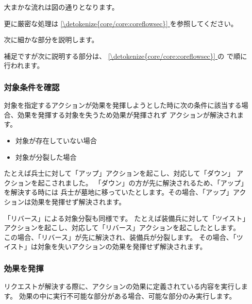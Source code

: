 \documentclass[letterpaper,10pt,dvipdfmx]{sphinxmanual}
\begin{document}
\sphinxAtStartPar
大まかな流れは図の通りとなります。

\sphinxAtStartPar
更に厳密な処理は \hyperref[\detokenize{core/core:coreflowsec}]{\ref{\detokenize{core/core:coreflowsec}} } を参照してください。

\sphinxAtStartPar
次に細かな部分を説明します。

\sphinxAtStartPar
補足ですが次に説明する部分は、 \hyperref[\detokenize{core/core:coreflowsec}]{\ref{\detokenize{core/core:coreflowsec}} } の {\hyperref[\detokenize{core/core:actresolve}]{}} で順に行われます。


\subsubsection{対象条件を確認}
\label{\detokenize{common/common:id29}}
\sphinxAtStartPar
対象を指定するアクションが効果を発揮しようとした時に次の条件に該当する場合、効果を発揮する対象を失うため効果が発揮されず
アクションが解決されます。
\begin{itemize}
\item {} 
\sphinxAtStartPar
対象が存在していない場合

\item {} 
\sphinxAtStartPar
対象が分裂した場合

\end{itemize}

\sphinxAtStartPar
たとえば兵士に対して「アップ」アクションを起こし、対応して「ダウン」
アクションを起こされました。
「ダウン」の方が先に解決されるため、「アップ」を解決する時には
兵士が墓地に移っていたとします。その場合、「アップ」アクションは効果を発揮せず解決されます。

\sphinxAtStartPar
「リバース」による対象分裂も同様です。
たとえば装備兵に対して「ツイスト」アクションを起こし、対応して「リバース」アクションを起こしたとします。
この場合、「リバース」が先に解決され、装備兵が分裂します。
その場合、「ツイスト」は対象を失いアクションの効果を発揮せず解決されます。


\subsubsection{効果を発揮}
\label{\detokenize{common/common:id30}}
\sphinxAtStartPar
リクエストが解決する際に、アクションの効果に定義されている内容を実行します。
効果の中に実行不可能な部分がある場合、可能な部分のみ実行します。
\end{document}
